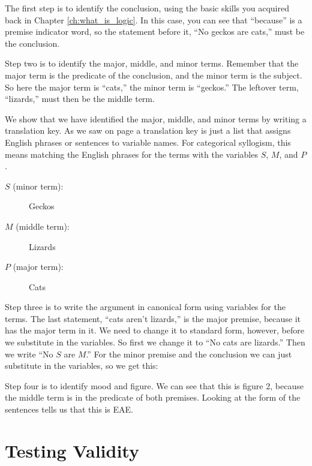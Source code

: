 The first step is to identify the conclusion, using the basic skills you acquired back in Chapter \ref{ch:what_is_logic}. In this case, you can see that ``because'' is a premise indicator word, so the statement before it, ``No geckos are cats,'' must be the conclusion.

Step two is to identify the major, middle, and minor terms. Remember that the major term is the predicate of the conclusion, and the minor term is the subject. So here the major term is ``cats,'' the minor term is ``geckos.'' The leftover term, ``lizards,'' must then be the middle term.

We show that we have identified the major, middle, and minor terms by writing a \gls{translation key}\label{def:translation_key}. As we saw on page \pageref{def:translation_key} a translation key is just a list that assigns English phrases or sentences to variable names. For categorical syllogism, this means matching the English phrases for the terms with the variables $S$, $M$, and $P$.

\begin{description}
\item[$S$ (minor term):] Geckos
\item[$M$ (middle term):] Lizards
\item[$P$ (major term):] Cats
\end{description}

Step three is to write the argument in canonical form using variables for the terms. The last statement, ``cats aren't lizards,'' is the major premise, because it has the major term in it. We need to change it to standard form, however, before we substitute in the variables. So first we change it to ``No cats are lizards.'' Then we write ``No $S$ are $M$.'' For the minor premise and the conclusion we can just substitute in the variables, so we get this:

\begin{kormanize}
\end{kormanize}

Step four is to identify mood and figure. We can see that this is figure 2, because the middle term is in the predicate of both premises. Looking at the form of the sentences tells us that this is EAE.

\section{Testing Validity}\label{sec:testing_validity}

